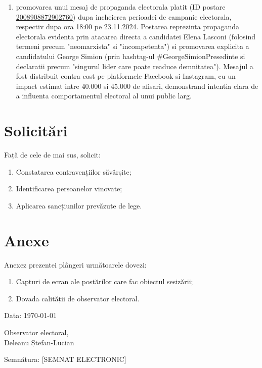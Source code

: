 \documentclass[a4paper,12pt]{article}
\begin{document}
\begin{enumerate}[leftmargin=*, label=\arabic*.)]
    \item promovarea unui mesaj de propaganda electorala platit (ID postare \href{https://www.facebook.com/ads/library/?id=2008908872902760}{2008908872902760}) dupa incheierea perioadei de campanie electorala, respectiv dupa ora 18:00 pe 23.11.2024. Postarea reprezinta propaganda electorala evidenta prin atacarea directa a candidatei Elena Lasconi (folosind termeni precum "neomarxista" si "incompetenta") si promovarea explicita a candidatului George Simion (prin hashtag-ul \#GeorgeSimionPresedinte si declaratii precum "singurul lider care poate readuce demnitatea"). Mesajul a fost distribuit contra cost pe platformele Facebook si Instagram, cu un impact estimat intre 40.000 si 45.000 de afisari, demonstrand intentia clara de a influenta comportamentul electoral al unui public larg.
\end{enumerate}

\vspace{0.5cm}

\section{Solicitări}

Față de cele de mai sus, solicit:

\begin{enumerate}[leftmargin=*, label=\arabic*.]
    \item Constatarea contravențiilor săvârșite;
    \item Identificarea persoanelor vinovate;
    \item Aplicarea sancțiunilor prevăzute de lege.
\end{enumerate}

\section{Anexe}

Anexez prezentei plângeri următoarele dovezi:

\begin{enumerate}[leftmargin=*, label=\arabic*.]
    \item Capturi de ecran ale postărilor care fac obiectul sesizării;
    \item Dovada calității de observator electoral.
\end{enumerate}

\vspace{1cm}
\noindent Data: \today

\vspace{1.5cm}
\noindent Observator electoral,\\[0.3cm]
Deleanu Ștefan-Lucian

\vspace{1cm}
\noindent Semnătura: [SEMNAT ELECTRONIC]
\end{document}
